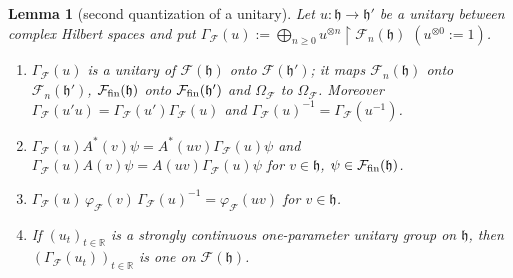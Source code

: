 \documentclass[11pt,a4paper]{article}
\theoremstyle{plain}
\newtheorem{lemma}[theorem]{Lemma}
\theoremstyle{definition}
\theoremstyle{plain}
\theoremstyle{definition}
\newcommand{\R}{\mathbb{R}}
\begin{document}
\begin{lemma}[second quantization of a unitary]\label{lem:ff-gamma}
Let $u:\mathfrak h\to\mathfrak h'$ be a unitary between complex Hilbert spaces and put
$\Gamma_{\!\mathcal F}(u):=\bigoplus_{n\ge0}u^{\otimes n}\upharpoonright\mathcal F_n(\mathfrak h)$
$(u^{\otimes0}:=1)$.
\begin{enumerate}
\item[\textup{(i)}] $\Gamma_{\!\mathcal F}(u)$ is a unitary of $\mathcal F(\mathfrak h)$ onto
$\mathcal F(\mathfrak h')$; it maps $\mathcal F_n(\mathfrak h)$ onto $\mathcal F_n(\mathfrak h')$,
$\mathcal F_{\rm fin}(\mathfrak h)$ onto $\mathcal F_{\rm fin}(\mathfrak h')$ and
$\Omega_{\mathcal F}$ to $\Omega_{\mathcal F}$.  Moreover $\Gamma_{\!\mathcal F}(u'u)=
\Gamma_{\!\mathcal F}(u')\Gamma_{\!\mathcal F}(u)$ and $\Gamma_{\!\mathcal F}(u)^{-1}=
\Gamma_{\!\mathcal F}(u^{-1})$.
\item[\textup{(ii)}] $\Gamma_{\!\mathcal F}(u)A^*(v)\psi=A^*(uv)\Gamma_{\!\mathcal F}(u)\psi$ and
$\Gamma_{\!\mathcal F}(u)A(v)\psi=A(uv)\Gamma_{\!\mathcal F}(u)\psi$ for $v\in\mathfrak h$,
$\psi\in\mathcal F_{\rm fin}(\mathfrak h)$.
\item[\textup{(iii)}] $\Gamma_{\!\mathcal F}(u)\,\varphi_{\mathcal F}(v)\,
\Gamma_{\!\mathcal F}(u)^{-1}=\varphi_{\mathcal F}(uv)$ for $v\in\mathfrak h$.
\item[\textup{(iv)}] If $(u_t)_{t\in\R}$ is a strongly continuous one-parameter unitary group
on $\mathfrak h$, then $(\Gamma_{\!\mathcal F}(u_t))_{t\in\R}$ is one on
$\mathcal F(\mathfrak h)$.
\end{enumerate}
\end{lemma}
\end{document}
